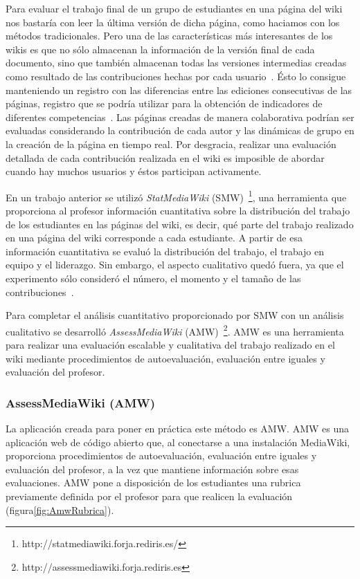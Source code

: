 Para evaluar el trabajo final de un grupo de estudiantes en una página del wiki nos bastaría con leer la última versión de dicha página, como haciamos con los métodos tradicionales. Pero una de las características más interesantes de los wikis es que no sólo almacenan la información de la versión final de cada documento, sino que también almacenan todas las versiones intermedias creadas como resultado de las contribuciones hechas por cada usuario~\cite{trentin2009using}. Ésto lo consigue manteniendo un registro con las diferencias entre las ediciones consecutivas de las páginas, registro que se podría utilizar para la obtención de indicadores de diferentes competencias~\cite{ortega2011new}. Las páginas creadas de manera colaborativa podrían ser evaluadas considerando la contribución de cada autor y las dinámicas de grupo en la creación de la página en tiempo real. Por desgracia, realizar una evaluación detallada de cada contribución realizada en el wiki es imposible de abordar cuando hay muchos usuarios y éstos participan activamente.

En un trabajo anterior se utilizó \emph{StatMediaWiki} (SMW)~\footnote{http://statmediawiki.forja.rediris.es/}, una herramienta que proporciona al profesor información cuantitativa sobre la distribución del trabajo de los estudiantes en las páginas del wiki, es decir, qué parte del trabajo realizado en una página del wiki corresponde a cada estudiante. A partir de esa información cuantitativa se evaluó la distribución del trabajo, el trabajo en equipo y el liderazgo. Sin embargo, el aspecto cualitativo quedó fuera, ya que el experimento sólo consideró el número, el momento y el tamaño de las contribuciones~\cite{palomo2014assessment}.

Para completar el análisis cuantitativo proporcionado por SMW con un análisis cualitativo se desarrolló \emph{AssessMediaWiki} (AMW)~\footnote{http://assessmediawiki.forja.rediris.es}. AMW es una herramienta para realizar una evaluación escalable y cualitativa del trabajo realizado en el wiki mediante procedimientos de autoevaluación, evaluación entre iguales y evaluación del profesor.

\subsubsection{AssessMediaWiki (AMW)}

La aplicación creada para poner en práctica este método es AMW. AMW es una aplicación web de código abierto que, al conectarse a una instalación MediaWiki, proporciona procedimientos de autoevaluación, evaluación entre iguales y evaluación del profesor, a la vez que mantiene información sobre esas evaluaciones. AMW pone a disposición de los estudiantes una rubrica previamente definida por el profesor para que realicen la evaluación (figura\ref{fig:AmwRubrica}). 

